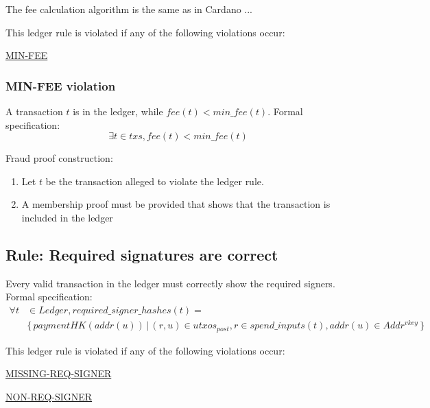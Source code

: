 \documentclass[../midgard.tex]{subfiles}
\begin{document}
The fee calculation algorithm is the same as in Cardano ... \todo

This ledger rule is violated if any of the following violations occur:
\begin{itemize-multi}
  \item \hyperref[violation:MIN-FEE]{MIN-FEE}
\end{itemize-multi} 

\subsubsection{MIN-FEE violation}
\label{violation:MIN-FEE}
A transaction $t$ is in the ledger, while $fee(t) < min\_fee(t)$.
Formal specification:
\begin{equation*}
    \exists t \in txs, fee(t) < min\_fee(t)
\end{equation*}

Fraud proof construction:
\begin{enumerate}
  \item Let $t$ be the transaction alleged to violate the ledger rule. 
  \item A membership proof must be provided that shows that the transaction is included in the ledger
\end{enumerate}

\subsection{Rule: Required signatures are correct}
\label{rule:required-signatures-are-correct}
Every valid transaction in the ledger must correctly show the required signers.
Formal specification:
\begin{equation*}
\begin{split}
    \forall t & \in Ledger, required\_signer\_hashes(t) = \\
    & \{ \, paymentHK(addr(u)) \, | \, (r, u) \in utxos_{post}, r \in spend\_inputs(t), addr(u) \in Addr^{vkey} \, \}
\end{split}
\end{equation*}
    
This ledger rule is violated if any of the following violations occur:
\begin{itemize-multi}
  \item \hyperref[violation:MISSING-REQ-SIGNER]{MISSING-REQ-SIGNER}
  \item \hyperref[violation:NON-REQ-SIGNER]{NON-REQ-SIGNER}
\end{itemize-multi}
\end{document}
